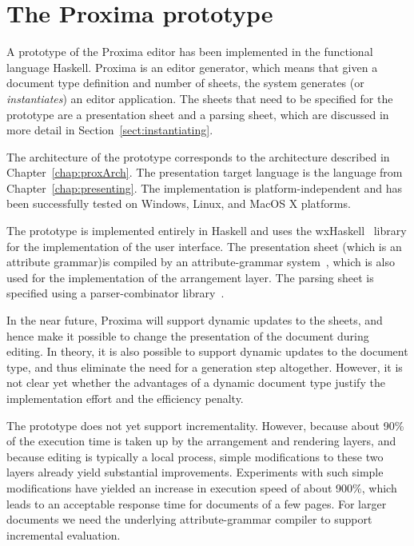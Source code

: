 \chapter{The Proxima prototype} \label{chap:prototype}


\newcommand{\epsfigPrx}[3]{\epsfig{file=pics/Screenshots/#1, height=#3mm}}

A prototype of the Proxima editor has been implemented in the functional language Haskell. Proxima is an editor generator, which means that given a document type definition and number of sheets, the system generates (or {\em instantiates}) an editor application. The sheets that need to be specified for the prototype are a presentation sheet and a parsing sheet, which are discussed in more detail in Section~\ref{sect:instantiating}.

The architecture of the prototype corresponds to the architecture described in Chapter~\ref{chap:proxArch}. The presentation target language is the {\Xprez} language from Chapter~\ref{chap:presenting}. The implementation is platform-independent and has been successfully tested on Windows, Linux, and MacOS X platforms. 

The prototype is implemented entirely in Haskell and uses the wxHaskell~\cite{leijen04wxHaskell} library for the implementation of the user interface. The presentation sheet \bc (which is an attribute grammar)\ec  is compiled by an  attribute-grammar system~\cite{swierstra04ag}, which is also used for the implementation of the arrangement layer. The parsing sheet is specified using a parser-combinator library~\cite{swierstra01parsers}.



In the near future, Proxima will support dynamic updates to the sheets, and hence make it possible to change the presentation of the document during editing. In theory, it is also possible to support dynamic updates to the document type, and thus eliminate the need for a generation step altogether. However, it is not clear yet whether the advantages of a dynamic document type justify the implementation effort and the efficiency penalty. 


The prototype does not yet support incrementality. However, because about 90\% 
of the execution time is taken up by the arrangement and rendering layers, and because editing is typically a local process, simple modifications to these two layers already yield substantial improvements. Experiments with such simple modifications have yielded an increase in execution speed of about 900\%,
which leads to an acceptable response time for documents of a few pages. For larger documents we need the underlying attribute-grammar compiler to support incremental evaluation.


